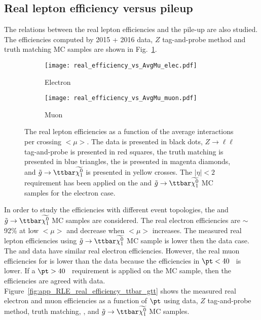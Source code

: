\subsection{Real lepton efficiency versus pileup}
\label{subsec:app_RLE_vs_pileup}
The relations between the real lepton efficiencies and the pile-up are also studied.
The efficiencies computed by 2015 + 2016 data, $Z$ tag-and-probe method and truth matching MC samples are shown in Fig.~\ref{fig:app_RLE_vs_pileup}.
%
\begin{figure}[htbp]
    \begin{subfigure}[b]{0.48\textwidth}
        \begin{center}
            \texttt{[image: real\_efficiency\_vs\_AvgMu\_elec.pdf]}
            \caption{Electron}
        \end{center}
    \end{subfigure}
    \begin{subfigure}[b]{0.48\textwidth}
        \begin{center}
            \texttt{[image: real\_efficiency\_vs\_AvgMu\_muon.pdf]}
            \caption{Muon}
        \end{center}
    \end{subfigure}
    \caption{The real lepton efficiencies as a function of the average interactions per crossing $<\mu>$.
    The data is presented in black dots,  $Z\to \ell\ell$ tag-and-probe is presented in red squares, the truth matching is presented in blue triangles, the \ttbar is presented in magenta diamonds, and $\tilde{g} \to \ttbar \widetilde{\chi^{0}_{1}}$ is presented in yellow crosses.
    The $|\eta|<2$ requirement has been applied on the \ttbar and $\tilde{g} \to \ttbar \widetilde{\chi^{0}_{1}}$ MC samples for the electron case.}
\label{fig:app_RLE_vs_pileup}
\end{figure}
%
In order to study the efficiencies with different event topologies, the \ttbar and $\tilde{g} \to \ttbar \widetilde{\chi^{0}_{1}}$ MC samples are considered.
The real electron efficiencies are $\sim$92\% at low $<\mu>$ and decrease when $<\mu>$ increases.
The measured real lepton efficiencies using $\tilde{g} \to \ttbar \widetilde{\chi^{0}_{1}}$ MC sample is lower then the data case.
The \ttbar and data have similar real electron efficiencies.
However, the real muon efficiencies for \ttbar is lower than the data because the efficiencies in $\pt < 40$~{\GeV} is lower.
If a $\pt > 40$~{\GeV} requirement is applied on the \ttbar MC sample, then the efficiencies are agreed with data.
Figure~\ref{fig:app_RLE_real_efficiency_ttbar_gtt} shows the measured real electron and muon efficiencies as a function of $\pt$ using data, $Z$ tag-and-probe method, truth matching, \ttbar, and $\tilde{g} \to \ttbar \widetilde{\chi^{0}_{1}}$ MC samples.
